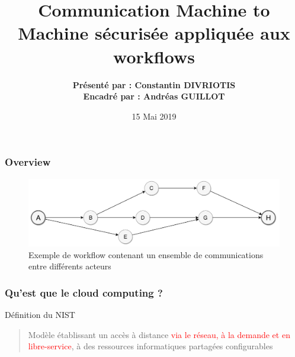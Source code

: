 \documentclass{beamer}
\title[Communications intra et inter cloud]{Communication Machine to Machine sécurisée appliquée aux workflows} %
\author[Constantin DIVRIOTIS]{\textbf {Présenté par : Constantin DIVRIOTIS \\ \footnotesize Encadré par : Andréas GUILLOT}} %
\institute[Unistra] %
{Equipe réseaux - UFR Mathématique et Informatique -
Université de Strasbourg \\ %
\medskip
\textit{constantin.divriotis@etu.unistra.fr} %
}
\date{15 Mai 2019} %
\begin{document}
\begin{frame}
\titlepage %
\end{frame}



\begin{frame}
\frametitle{Overview} %
	\begin{figure}
		\centering
		\captionsetup{justification=centering}
		\includegraphics[width=.95\textwidth]{./pics/systeme_workflow.png}
		\caption{Exemple de workflow contenant un ensemble de communications entre différents acteurs}
		\label{figure1}
	\end{figure}
\end{frame}




\begin{frame}
\frametitle{Qu'est que le cloud computing ?}

\begin{block}{Définition du NIST}
	\begin{quote}
		Modèle établissant un accès à distance \textcolor{red}{via le réseau, à la demande et en libre-service}, à des ressources informatiques partagées
	configurables
	\end{quote}
\end{block}

\end{frame}


\end{document}
